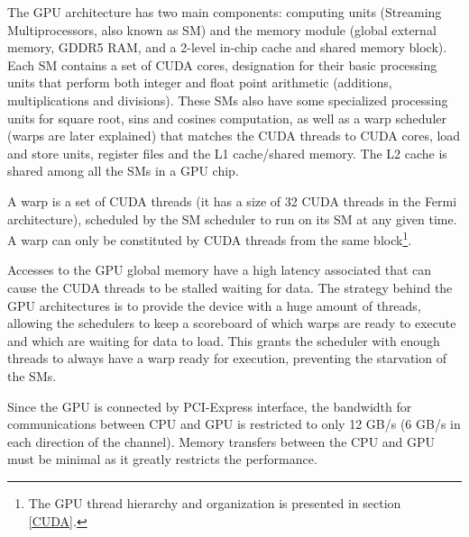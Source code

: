The \nvidia GPU architecture has two main components: computing units (Streaming Multiprocessors, also known as SM) and the memory module (global external memory, GDDR5 RAM, and a 2-level in-chip cache and shared memory block). Each SM contains a set of CUDA cores, \nvidia designation for their basic processing units that perform both integer and float point arithmetic (additions, multiplications and divisions). These SMs also have some specialized processing units for square root, sins and cosines computation, as well as a warp scheduler (warps are later explained) that matches the CUDA threads to CUDA cores, load and store units, register files and the L1 cache/shared memory. The L2 cache is shared among all the SMs in a GPU chip.

A warp is a set of CUDA threads (it has a size of 32 CUDA threads in the Fermi architecture), scheduled by the SM scheduler to run on its SM at any given time. A warp can only be constituted by CUDA threads from the same block\footnote{The GPU thread hierarchy and organization is presented in section \ref{CUDA}.}.

Accesses to the GPU global memory have a high latency associated that can cause the CUDA threads to be stalled waiting for data. The strategy behind the GPU architectures is to provide the device with a huge amount of threads, allowing the schedulers to keep a scoreboard of which warps are ready to execute and which are waiting for data to load. This grants the scheduler with enough threads to always have a warp ready for execution, preventing the starvation of the SMs.

Since the GPU is connected by PCI-Express interface, the bandwidth for communications between CPU and GPU is restricted to only 12 GB/s (6 GB/s in each direction of the channel). Memory transfers between the CPU and GPU must be minimal as it greatly restricts the performance.

